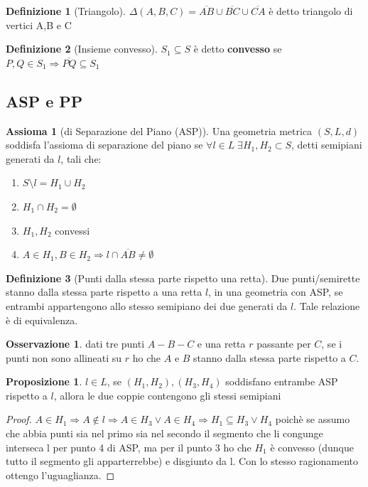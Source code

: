 \documentclass[a4paper,10pt]{article}
\theoremstyle{definition}
\theoremstyle{indentdefinition}
\newtheorem{defn}{Definizione}[section]
\theoremstyle{indentpostulate}
\newtheorem{axiom}{Assioma}[section]
\theoremstyle{indenttheorem}
\newtheorem{prop}{Proposizione}[section]
\theoremstyle{myremark}
\newtheorem*{rem*}{Osservazione}
\theoremstyle{indentgeneral}
\begin{document}
\begin{defn}[Triangolo]  $\Delta (A,B,C)= \overline{AB} \cup \overline{BC} \cup \overline{CA}$ è detto triangolo di vertici A,B e C
\end{defn}
\begin{defn}[Insieme convesso] 
$S_1 \subseteq S$ è detto \textbf{convesso} se $P,Q \in S_1 \Rightarrow \overline{PQ} \subseteq S_1$    \end{defn} 

\subsection{ASP e PP}
\begin{axiom}[di Separazione del Piano (ASP)]
    Una geometria metrica $(S,L,d)$ soddisfa l'assioma di separazione del piano se $\forall l \in L \;\exists H_1,H_2 \subset S$, detti semipiani generati da $l$, tali che:
\begin{enumerate}
    \item $S\setminus l=H_1 \cup H_2$
    \item $H_1 \cap H_2= \emptyset$
    \item $H_1,H_2$ convessi
    \item $A \in H_1, B \in H_2 \Rightarrow l \cap \overline{AB} \neq \emptyset$
\end{enumerate}
\end{axiom}

\begin{defn}[Punti dalla stessa parte rispetto una retta]   Due punti/semirette stanno dalla stessa parte rispetto a una retta $l$, in una geometria con ASP, se entrambi appartengono allo stesso semipiano dei due generati da $l$. Tale relazione è di equivalenza.   \end{defn} 

\begin{rem*} dati tre punti $A-B-C$ e una retta $r$ passante per $C$, se i punti non sono allineati su $r$ ho che $A$ e $B$ stanno dalla stessa parte rispetto a $C$.
\end{rem*}
\begin{prop}
   $l  \in L$, se $(H_1,H_2),(H_3,H_4)$ soddisfano entrambe ASP rispetto a $l$, allora le due coppie contengono gli stessi semipiani
\end{prop}


\begin{proof}    $A \in H_1 \Rightarrow A \not \in l \Rightarrow A \in H_3 \lor A \in H_4 \Rightarrow H_1 \subseteq H_3 \lor H_4$ poichè se assumo che abbia punti sia nel primo sia nel secondo il segmento che li congunge interseca l per punto 4 di ASP, ma per il punto 3 ho che $H_1$ è convesso (dunque tutto il segmento gli apparterrebbe) e disgiunto da l. Con lo stesso ragionamento ottengo l'uguaglianza.   \end{proof}
\end{document}
